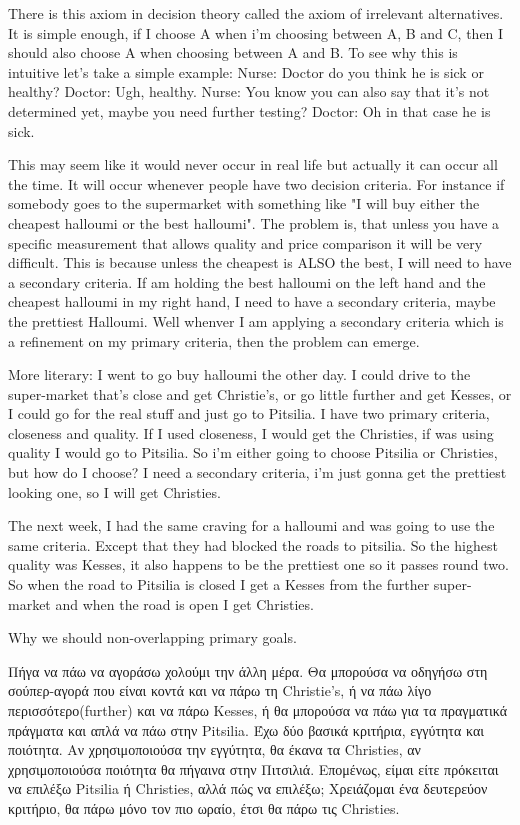 \documentclass[12pt]{report}
\numberwithin{equation}{section}
\begin{document}
There is this axiom in decision theory called the axiom of irrelevant alternatives. It is simple enough, if I choose A when i'm choosing between A, B and C, then I should also choose A when choosing between A and B. To see why this is intuitive let's take a simple example: 
Nurse: Doctor do you think he is sick or healthy?
Doctor: Ugh, healthy.
Nurse: You know you can also say that it's not determined yet, maybe you need further testing?
Doctor: Oh in that case he is sick. 

This may seem like it would never occur in real life but actually it can occur all the time. It will occur whenever people have two decision criteria. For instance if somebody goes to the supermarket with something like "I will buy either the cheapest halloumi or the best halloumi". The problem is, that unless you have a specific measurement that allows quality and price comparison it will be very difficult. This is because unless the cheapest is ALSO the best, I will need to have a secondary criteria. If am holding the best halloumi on the left hand and the cheapest halloumi in my right hand, I need to have a secondary criteria, maybe the prettiest Halloumi. Well whenver I am applying a secondary criteria which is a refinement on my primary criteria, then the problem can emerge. 

More literary:
I went to go buy halloumi the other day. I could drive to the super-market that's close and get Christie's, or go little further and get Kesses, or I could go for the real stuff and just go to Pitsilia. I have two primary criteria, closeness and quality. If I used closeness, I would get the Christies, if was using quality I would go to Pitsilia. So i'm either going to choose Pitsilia or Christies, but how do I choose? I need a secondary criteria, i'm just gonna get the prettiest looking one, so I will get Christies. 

The next week, I had the same craving for a halloumi and was going to use the same criteria. Except that they had blocked the roads to pitsilia. So the highest quality was Kesses, it also happens to be the prettiest one so it passes round two. So when the road to Pitsilia is closed I get a Kesses from the further super-market and when the road is open I get Christies. 

Why we should non-overlapping primary goals.

Πήγα να πάω να αγοράσω χολούμι την άλλη μέρα. Θα μπορούσα να οδηγήσω στη σούπερ-αγορά που είναι κοντά και να πάρω τη Christie's, ή να πάω λίγο περισσότερο(further) και να πάρω Kesses, ή θα μπορούσα να πάω για τα πραγματικά πράγματα και απλά να πάω στην Pitsilia. Έχω δύο βασικά κριτήρια, εγγύτητα και ποιότητα. Αν χρησιμοποιούσα την εγγύτητα, θα έκανα τα Christies, αν χρησιμοποιούσα ποιότητα θα πήγαινα στην Πιτσιλιά. Επομένως, είμαι είτε πρόκειται να επιλέξω Pitsilia ή Christies, αλλά πώς να επιλέξω; Χρειάζομαι ένα δευτερεύον κριτήριο, θα πάρω μόνο τον πιο ωραίο, έτσι θα πάρω τις Christies.
\end{document}
